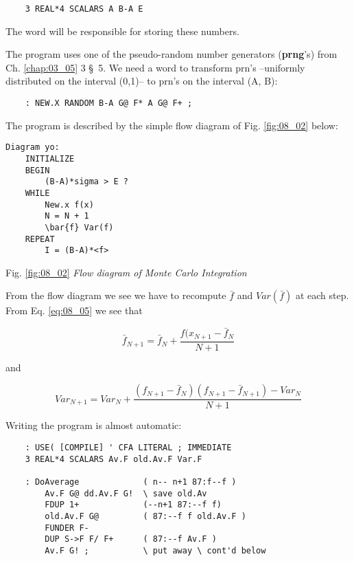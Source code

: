 \begin{lstlisting}
    3 REAL*4 SCALARS A B-A E
\end{lstlisting}

The word  will be responsible for storing these numbers.

The program uses one of the pseudo-random number generators (\textbf{prng}'s) from Ch. \ref{chap:03_05} 3 \S\ 5. We need a word to transform prn's --uniformly distributed on the interval (0,1)-- to prn's on the interval (A, B):

\begin{lstlisting}
    : NEW.X RANDOM B-A G@ F* A G@ F+ ;
\end{lstlisting}

The program is described by the simple flow diagram of Fig. \ref{fig:08_02} below:

\begin{lstlisting}
Diagram yo:
    INITIALIZE
    BEGIN
        (B-A)*sigma > E ?
    WHILE
        New.x f(x)
        N = N + 1
        \bar{f} Var(f)
    REPEAT
        I = (B-A)*<f>
\end{lstlisting}\label{fig:08_02}

Fig. \ref{fig:08_02} \textit{Flow diagram of Monte Carlo Integration}

From the flow diagram we see we have to recompute $\bar{f}$ and $Var(\bar{f})$ at each step. From Eq. \ref{eq:08_05} we see that

\begin{equation*}
\bar{f}_{N+1} = \bar{f}_N + \frac{f(x_{N+1} - \bar{f}_{N}}{N + 1}
\end{equation*}

and

\begin{equation*}
Var_{N+1} = Var_{N} + \frac{(f_{N+1}-\bar{f}_{N})(f_{N+1} - \bar{f}_{N+1})-Var_{N}}{N+1}
\end{equation*}

Writing the program is almost automatic:

\begin{lstlisting}
    : USE( [COMPILE] ' CFA LITERAL ; IMMEDIATE
    3 REAL*4 SCALARS Av.F old.Av.F Var.F

    : DoAverage             ( n-- n+1 87:f--f )
        Av.F G@ dd.Av.F G!  \ save old.Av
        FDUP 1+             (--n+1 87:--f f)
        old.Av.F G@         ( 87:--f f old.Av.F )
        FUNDER F-
        DUP S->F F/ F+      ( 87:--f Av.F )
        Av.F G! ;           \ put away \ cont'd below
\end{lstlisting}


